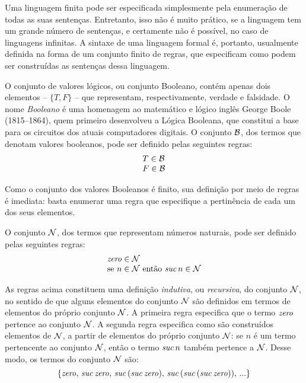 Uma linguagem finita pode ser especificada simplesmente pela enumera\c{c}\~ao de todas as suas  sentenças. Entretanto, isso não é muito prático, se a linguagem tem um grande número de sentenças, e certamente não é possível, no caso de linguagens infinitas. A sintaxe de uma linguagem formal é, portanto, usualmente definida na forma de um conjunto finito de regras, que especificam como podem ser construídas as sentenças dessa linguagem.


\begin{Definition}
  O conjunto de valores lógicos, ou conjunto Booleano, contém apenas dois elementos -- $\{T,F\}$ -- que representam, respectivamente, verdade e falsidade. O nome \emph{Booleano} é uma homenagem ao matemático e lógico inglês George Boole  (1815--1864), quem primeiro desenvolveu a Lógica Booleana, que constitui a base para os circuitos dos atuais computadores digitais. O conjunto $\mathcal{B}$, dos termos que denotam valores booleanos, pode ser definido pelas seguintes regras:
  \[
      \begin{array}{l}
        T \in\mathcal{B}\\
        F \in\mathcal{B}
      \end{array}
  \]
\end{Definition}

Como o conjunto dos valores Booleanos \'e finito, sua defini\c{c}\~ao por meio de regras \'e imediata: basta enumerar uma regra que especifique a pertinência de cada um dos seus elementos.

\begin{Definition}
O conjunto $\mathcal{N}$, dos termos que representam n\'umeros naturais, pode ser definido pelas seguintes regras:
\[
   \begin{array}{l}
     \textit{zero\/} \in \mathcal{N}\\
     \text{se $n \in \mathcal{N}$ ent\~ao $\textit{suc\/}\, n\in\mathcal{N}$}
   \end{array}
\]
\end{Definition}
As regras acima constituem uma definição \emph{indutiva}, ou \emph{recursiva\/}, do conjunto $\mathcal{N}$, no sentido de que alguns elementos do conjunto $\mathcal{N}$ são definidos em termos de elementos do próprio conjunto $\mathcal{N}$. A primeira regra especifica que o termo $\textit{zero\/}$ pertence ao conjunto $\mathcal{N}$. A segunda regra especifica como são construídos elementos de $\mathcal{N}$, a partir de elementos do próprio conjunto $\mathcal{N}$:  se $n$ \'e um termo pertencente ao conjunto $\mathcal{N}$, ent\~ao o termo $\textit{suc\/}\,n$ tamb\'em pertence a $\mathcal{N}$. Desse modo, os termos do conjunto $\mathcal{N}$ são:
\[ \{\textit{zero\/},\,\textit{suc\/}\,\textit{zero\/},\,\textit{suc\/}\,(\textit{suc\/}\,\textit{zero\/}),\, \textit{suc\/}\,(\textit{suc\/}\,(\textit{suc\/}\,\textit{zero\/})),\,...\} \]

